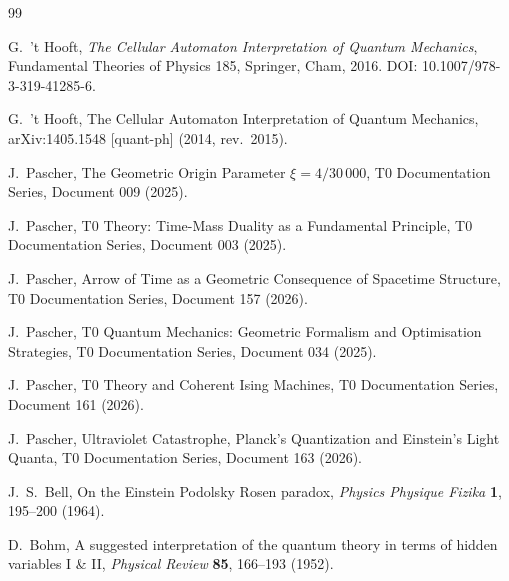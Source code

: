 \begin{thebibliography}{99}

G.\ 't Hooft,
\newblock \emph{The Cellular Automaton Interpretation of Quantum Mechanics},
\newblock Fundamental Theories of Physics 185,
\newblock Springer, Cham, 2016.
\newblock DOI: 10.1007/978-3-319-41285-6.

G.\ 't Hooft,
\newblock The Cellular Automaton Interpretation of Quantum Mechanics,
\newblock arXiv:1405.1548 [quant-ph] (2014, rev.\ 2015).

J.\ Pascher,
\newblock The Geometric Origin Parameter $\xi = 4/30\,000$,
\newblock T0 Documentation Series, Document 009 (2025).

J.\ Pascher,
\newblock T0 Theory: Time-Mass Duality as a Fundamental Principle,
\newblock T0 Documentation Series, Document 003 (2025).

J.\ Pascher,
\newblock Arrow of Time as a Geometric Consequence of Spacetime Structure,
\newblock T0 Documentation Series, Document 157 (2026).

J.\ Pascher,
\newblock T0 Quantum Mechanics: Geometric Formalism and Optimisation Strategies,
\newblock T0 Documentation Series, Document 034 (2025).

J.\ Pascher,
\newblock T0 Theory and Coherent Ising Machines,
\newblock T0 Documentation Series, Document 161 (2026).

J.\ Pascher,
\newblock Ultraviolet Catastrophe, Planck's Quantization and Einstein's Light Quanta,
\newblock T0 Documentation Series, Document 163 (2026).

J.\ S.\ Bell,
\newblock On the Einstein Podolsky Rosen paradox,
\newblock \emph{Physics Physique Fizika} \textbf{1}, 195--200 (1964).

D.\ Bohm,
\newblock A suggested interpretation of the quantum theory in terms of
hidden variables I \& II,
\newblock \emph{Physical Review} \textbf{85}, 166--193 (1952).

\end{thebibliography}
